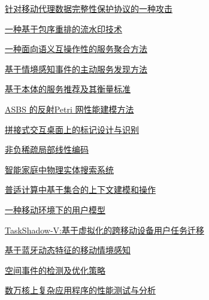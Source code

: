 \documentclass[a4paper]{article}
\begin{document}
\href{http://www.jos.org.cn/ch/reader/download_pdf.aspx?file_no=11022&year_id=2011&quarter_id=zk2&falg=1}{针对移动代理数据完整性保护协议的一种攻击}

\href{http://www.jos.org.cn/ch/reader/download_pdf.aspx?file_no=11023&year_id=2011&quarter_id=zk2&falg=1}{一种基于包序重排的流水印技术}

\href{http://www.jos.org.cn/ch/reader/download_pdf.aspx?file_no=11024&year_id=2011&quarter_id=zk2&falg=1}{一种面向语义互操作性的服务聚合方法}

\href{http://www.jos.org.cn/ch/reader/download_pdf.aspx?file_no=11025&year_id=2011&quarter_id=zk2&falg=1}{基于情境感知事件的主动服务发现方法}

\href{http://www.jos.org.cn/ch/reader/download_pdf.aspx?file_no=11026&year_id=2011&quarter_id=zk2&falg=1}{基于本体的服务推荐及其衡量标准}

\href{http://www.jos.org.cn/ch/reader/download_pdf.aspx?file_no=11027&year_id=2011&quarter_id=zk2&falg=1}{ASBS 的反射Petri 网性能建模方法}

\href{http://www.jos.org.cn/ch/reader/download_pdf.aspx?file_no=11028&year_id=2011&quarter_id=zk2&falg=1}{拼接式交互桌面上的标记设计与识别}

\href{http://www.jos.org.cn/ch/reader/download_pdf.aspx?file_no=11029&year_id=2011&quarter_id=zk2&falg=1}{非负稀疏局部线性编码}

\href{http://www.jos.org.cn/ch/reader/download_pdf.aspx?file_no=11030&year_id=2011&quarter_id=zk2&falg=1}{智能家庭中物理实体搜索系统}

\href{http://www.jos.org.cn/ch/reader/download_pdf.aspx?file_no=11031&year_id=2011&quarter_id=zk2&falg=1}{普适计算中基于集合的上下文建模和操作}

\href{http://www.jos.org.cn/ch/reader/download_pdf.aspx?file_no=11032&year_id=2011&quarter_id=zk2&falg=1}{一种移动环境下的用户模型}

\href{http://www.jos.org.cn/ch/reader/download_pdf.aspx?file_no=11033&year_id=2011&quarter_id=zk2&falg=1}{TaskShadow-V:基于虚拟化的跨移动设备用户任务迁移}

\href{http://www.jos.org.cn/ch/reader/download_pdf.aspx?file_no=11034&year_id=2011&quarter_id=zk2&falg=1}{基于蓝牙动态特征的移动情境感知}

\href{http://www.jos.org.cn/ch/reader/download_pdf.aspx?file_no=11035&year_id=2011&quarter_id=zk2&falg=1}{空间事件的检测及优化策略}

\href{http://www.jos.org.cn/ch/reader/download_pdf.aspx?file_no=11036&year_id=2011&quarter_id=zk2&falg=1}{数万核上复杂应用程序的性能测试与分析}
\end{document}
